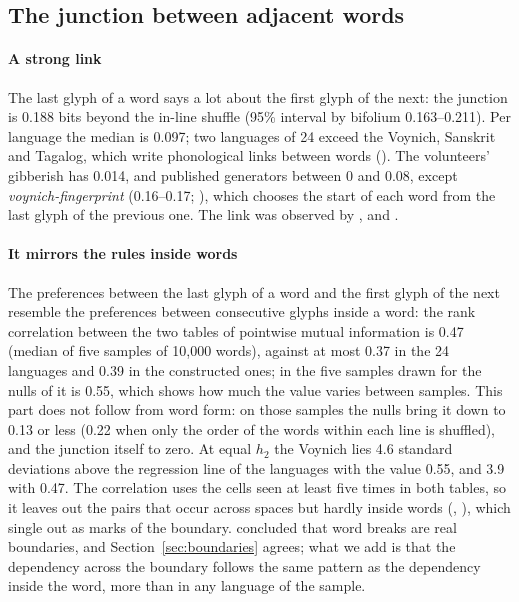 \subsection{The junction between adjacent words}
\label{sec:junction}

\paragraph{A strong link} The last glyph of a word says a lot about the first glyph of the next: the junction is 0.188
bits beyond the in-line shuffle (95\% interval by bifolium 0.163--0.211). Per language the median is 0.097; two
languages of 24 exceed the Voynich, Sanskrit and Tagalog, which write phonological links between words
(). The volunteers' gibberish has 0.014, and published generators between 0 and 0.08, except
\emph{voynich-fingerprint} (0.16--0.17; ), which chooses the start of each word from the last glyph of
the previous one. The link was
observed by \citet{currier1976}, \citet{smith2017lastfirst} and \citet{smithponzi2019}.

\paragraph{It mirrors the rules inside words} The preferences between the last glyph of a word and the first glyph of
the next resemble the preferences between consecutive glyphs inside a word: the rank correlation between the two tables
of pointwise mutual information is 0.47 (median of five samples of 10{,}000 words), against at most 0.37 in the 24
languages and 0.39 in the constructed ones; in the five samples drawn for the nulls of  it is 0.55,
which shows how much the value varies between samples. This part does not follow from word form: on those samples
the nulls bring it down to 0.13 or less (0.22 when only the order of the words within each line is shuffled), and the
junction itself to zero. At equal $h_2$ the Voynich lies 4.6 standard deviations above the regression line of the
languages with the value 0.55, and 3.9 with 0.47. The correlation uses the cells seen at least five times in both
tables, so it leaves out the pairs that occur across spaces but hardly inside words (, ), which
\citet{smithponzi2019} single out as marks of the boundary. \citet{smithponzi2019} concluded that word breaks are real boundaries, and
Section~\ref{sec:boundaries} agrees; what we add is that the dependency across the boundary follows the same pattern as
the dependency inside the word, more than in any language of the sample.

